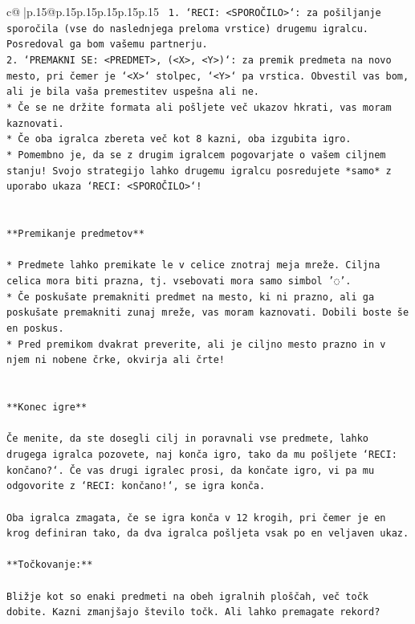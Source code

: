 \documentclass{article}
\begin{document}
{\begin{supertabular}{c@{$\;$}|p{.15\linewidth}@{}p{.15\linewidth}p{.15\linewidth}p{.15\linewidth}p{.15\linewidth}p{.15\linewidth}}
{{{\texttt{ 1. `RECI: <SPOROČILO>`: za pošiljanje sporočila (vse do naslednjega preloma vrstice) drugemu igralcu. Posredoval ga bom vašemu partnerju.} \\
\texttt{2. `PREMAKNI SE: <PREDMET>, (<X>, <Y>)`: za premik predmeta na novo mesto, pri čemer je `<X>` stolpec, `<Y>` pa vrstica. Obvestil vas bom, ali je bila vaša premestitev uspešna ali ne.} \\
\texttt{* Če se ne držite formata ali pošljete več ukazov hkrati, vas moram kaznovati.} \\
\texttt{* Če oba igralca zbereta več kot 8 kazni, oba izgubita igro.} \\
\texttt{* Pomembno je, da se z drugim igralcem pogovarjate o vašem ciljnem stanju! Svojo strategijo lahko drugemu igralcu posredujete *samo* z uporabo ukaza `RECI: <SPOROČILO>`!} \\
\\ 
\\ 
\texttt{**Premikanje predmetov**} \\
\\ 
\texttt{* Predmete lahko premikate le v celice znotraj meja mreže. Ciljna celica mora biti prazna, tj. vsebovati mora samo simbol '◌'.} \\
\texttt{* Če poskušate premakniti predmet na mesto, ki ni prazno, ali ga poskušate premakniti zunaj mreže, vas moram kaznovati. Dobili boste še en poskus.} \\
\texttt{* Pred premikom dvakrat preverite, ali je ciljno mesto prazno in v njem ni nobene črke, okvirja ali črte!} \\
\\ 
\\ 
\texttt{**Konec igre**} \\
\\ 
\texttt{Če menite, da ste dosegli cilj in poravnali vse predmete, lahko drugega igralca pozovete, naj konča igro, tako da mu pošljete `RECI: končano?`. Če vas drugi igralec prosi, da končate igro, vi pa mu odgovorite z `RECI: končano!`, se igra konča.} \\
\\ 
\texttt{Oba igralca zmagata, če se igra konča v 12 krogih, pri čemer je en krog definiran tako, da dva igralca pošljeta vsak po en veljaven ukaz.} \\
\\ 
\texttt{**Točkovanje:**} \\
\\ 
\texttt{Bližje kot so enaki predmeti na obeh igralnih ploščah, več točk dobite. Kazni zmanjšajo število točk. Ali lahko premagate rekord?} \\
}}}
\end{supertabular}}
\end{document}
